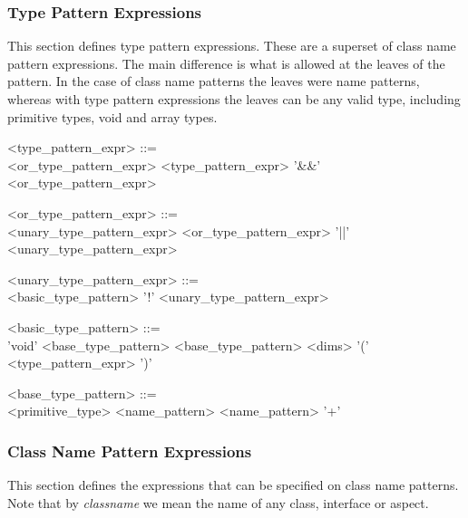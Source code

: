 \subsubsection{Type Pattern Expressions}

This section defines type pattern expressions.   These are a superset of
class name pattern expressions.  The main difference is what is allowed
at the leaves of the pattern.   In the case of class name patterns the
leaves were name patterns,  whereas with type pattern expressions the
leaves can be any valid type, including primitive types, void and
array types.

\begin{minipage}{6in}
\begin{blue}
\begin{grammar}
<type_pattern_expr> ::= \hspace{1in} \\
     <or_type_pattern_expr>
\alt <type_pattern_expr> '\&\&' <or_type_pattern_expr>

<or_type_pattern_expr> ::= \hspace{1in} \\
     <unary_type_pattern_expr>
\alt <or_type_pattern_expr> '||' <unary_type_pattern_expr>

<unary_type_pattern_expr> ::= \hspace{1in} \\
     <basic_type_pattern>
\alt '!' <unary_type_pattern_expr>

<basic_type_pattern> ::=  \hspace{1in} \\
     'void'
\alt <base_type_pattern>
\alt <base_type_pattern> {\red <dims>}
\alt '(' <type_pattern_expr> ')'

<base_type_pattern> ::= \hspace{1in} \\
     {\red <primitive_type>} 
\alt <name_pattern>
\alt <name_pattern> '+'
\end{grammar}
\end{blue}
\end{minipage}


\subsubsection{Class Name Pattern Expressions}

This section defines the expressions that can be specified on
class name patterns.  Note that by {\em classname} we mean the
name of any class, interface or aspect. 

